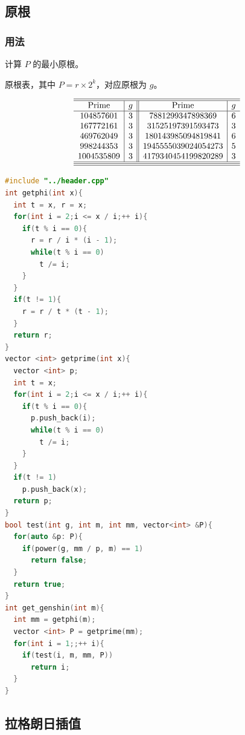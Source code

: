 \documentclass[10pt]{ctexart}
\begin{document}
\begin{multicols}{3}
    \subsection{原根}\label{ux539fux6839}

    \subsubsection{用法}\label{ux7528ux6cd5-7}

    计算 \(P\) 的最小原根。

    原根表，其中 \(P = r\times 2^{k}\)，对应原根为 \(g\)。

    \[
    \begin{array}{c|c||c|c}
    \hline\hline
    \mathrm{Prime} & g & \mathrm{Prime} & g \\ \hline
    104857601  & 3 & 7881299347898369 & 6 \\ 
    167772161  & 3 & 31525197391593473 & 3 \\ 
    469762049  & 3 & 180143985094819841 & 6 \\ 
    998244353  & 3 & 1945555039024054273 & 5 \\ 
    1004535809 & 3 & 4179340454199820289 & 3 \\ \hline\hline
    \hline 
    \end{array}
    \]

\begin{lstlisting}[language={C++}]
#include "../header.cpp"
int getphi(int x){
  int t = x, r = x;
  for(int i = 2;i <= x / i;++ i){
    if(t % i == 0){
      r = r / i * (i - 1);
      while(t % i == 0)
        t /= i;
    }
  }
  if(t != 1){
    r = r / t * (t - 1);
  }
  return r;
}
vector <int> getprime(int x){
  vector <int> p;
  int t = x;
  for(int i = 2;i <= x / i;++ i){
    if(t % i == 0){
      p.push_back(i);
      while(t % i == 0)
        t /= i;
    }
  }
  if(t != 1)
    p.push_back(x);
  return p;
}
bool test(int g, int m, int mm, vector<int> &P){
  for(auto &p: P){
    if(power(g, mm / p, m) == 1)
      return false;
  }
  return true;
}
int get_genshin(int m){
  int mm = getphi(m);
  vector <int> P = getprime(mm);
  for(int i = 1;;++ i){
    if(test(i, m, mm, P))
      return i;
  }
}
\end{lstlisting}

    \subsection{拉格朗日插值}\label{ux62c9ux683cux6717ux65e5ux63d2ux503c}


\end{multicols}
\end{document}
